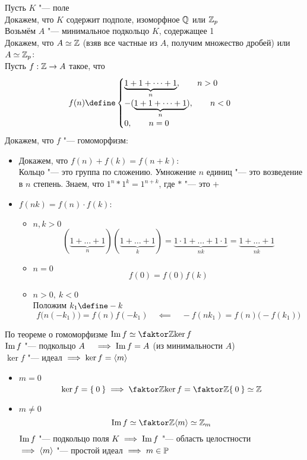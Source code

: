\begin{eproof}
	\item Пусть $ K $ "--- поле \\
	Докажем, что $ K $ содержит подполе, изоморфное $ \mathbb{Q} $ или $ \mathbb{Z}_p $ \\
	Возьмём $ A $ "--- минимальное подкольцо $ K $, содержащее 1 \\
	Докажем, что $ A \simeq \mathbb{Z} $ (взяв все частные из $ A $, получим множество дробей) или $ A \simeq \mathbb{Z}_p $: \\
	Пусть $ f : \mathbb{Z} \to A $ такое, что
	$$ f(n) \define
	\begin{cases}
		\underbrace{1 + 1 + \dots + 1}_n, \qquad n > 0 \\
		-(\underbrace{1 + 1 + \dots + 1}_n), \qquad n < 0 \\
		0, \qquad n = 0
	\end{cases} $$
	Докажем, что $ f $ "--- гомоморфизм:
	\begin{itemize}
		\item Докажем, что $ f(n) + f(k) = f(n + k) $: \\
		Кольцо "--- это группа по сложению. Умножение $ n $ единиц "--- это возведение в $ n $ степень. Знаем, что $ 1^n * 1^k = 1^{n + k} $, где $ * $ "--- это $ + $
		\item $ f(nk) = f(n) \cdot f(k) $:
		\begin{itemize}
			\item $ n, k > 0 $
			$$ (\underbrace{1 + \dots + 1}_n)(\underbrace{1 + \dots + 1}_k) = \underbrace{1 \cdot 1 + \dots + 1 \cdot 1}_{nk} = \underbrace{1 + \dots + 1}_{nk} $$
			\item $ n = 0 $
			$$ f(0) = f(0) f(k) $$
			\item $ n > 0, ~ k < 0 $ \\
			Положим $ k_1 \define -k $
			$$ f \bigg( n(-k_1) \bigg) = f(n) f(-k_1) \quad \impliedby \quad -f(nk_1) = f(n) \bigg( -f(k_1) \bigg) $$
		\end{itemize}
	\end{itemize}
	По теореме о гомоморфизме $ \Img f \simeq \faktor\Z{\ker f} $ \\
	$ \operatorname{Im} f $ "--- подкольцо $ A \quad \implies \operatorname{Im} f = A $ (из минимальности $ A $) \\
	$ \ker f $ "--- идеал $ \implies \ker f = \Braket m $
	\begin{itemize}
		\item $ m = 0 $
		$$ \ker f = \set0 \implies \faktor\Z{\ker f} = \faktor\Z{\set0} \simeq \Z $$
		\item $ m \ne 0 $
		$$ \Img f \simeq \faktor\Z{\braket m} \simeq \Z_m $$
		$ \operatorname{Im} f $ "--- подкольцо поля $ K \implies \operatorname{Im} f $ "--- область целостности \\
		$ \implies \Braket m $ "--- простой идеал $ \implies m \in \mathbb{P} $
	\end{itemize}
\end{eproof}

